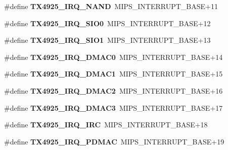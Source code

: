 \begin{DoxyCompactItemize}
\#define {\bfseries T\+X4925\+\_\+\+I\+R\+Q\+\_\+\+N\+A\+ND}~M\+I\+P\+S\+\_\+\+I\+N\+T\+E\+R\+R\+U\+P\+T\+\_\+\+B\+A\+SE+11
\item 
\mbox{\label{group__bsp__interrupt_gad5daa99d1db51d64e13ead1ecc99c114}} 
\#define {\bfseries T\+X4925\+\_\+\+I\+R\+Q\+\_\+\+S\+I\+O0}~M\+I\+P\+S\+\_\+\+I\+N\+T\+E\+R\+R\+U\+P\+T\+\_\+\+B\+A\+SE+12
\item 
\mbox{\label{group__bsp__interrupt_ga7557e681b877f9a799e74fbb255dd68c}} 
\#define {\bfseries T\+X4925\+\_\+\+I\+R\+Q\+\_\+\+S\+I\+O1}~M\+I\+P\+S\+\_\+\+I\+N\+T\+E\+R\+R\+U\+P\+T\+\_\+\+B\+A\+SE+13
\item 
\mbox{\label{group__bsp__interrupt_ga954ddd540c7d88019a894b0a2479c614}} 
\#define {\bfseries T\+X4925\+\_\+\+I\+R\+Q\+\_\+\+D\+M\+A\+C0}~M\+I\+P\+S\+\_\+\+I\+N\+T\+E\+R\+R\+U\+P\+T\+\_\+\+B\+A\+SE+14
\item 
\mbox{\label{group__bsp__interrupt_ga2a1f853ad2494fb003dcf45a51c92e5e}} 
\#define {\bfseries T\+X4925\+\_\+\+I\+R\+Q\+\_\+\+D\+M\+A\+C1}~M\+I\+P\+S\+\_\+\+I\+N\+T\+E\+R\+R\+U\+P\+T\+\_\+\+B\+A\+SE+15
\item 
\mbox{\label{group__bsp__interrupt_ga41db98a82a3a2606a641107179d1d9ca}} 
\#define {\bfseries T\+X4925\+\_\+\+I\+R\+Q\+\_\+\+D\+M\+A\+C2}~M\+I\+P\+S\+\_\+\+I\+N\+T\+E\+R\+R\+U\+P\+T\+\_\+\+B\+A\+SE+16
\item 
\mbox{\label{group__bsp__interrupt_gaa31044b5246a223da704f5ee63cd3afe}} 
\#define {\bfseries T\+X4925\+\_\+\+I\+R\+Q\+\_\+\+D\+M\+A\+C3}~M\+I\+P\+S\+\_\+\+I\+N\+T\+E\+R\+R\+U\+P\+T\+\_\+\+B\+A\+SE+17
\item 
\mbox{\label{group__bsp__interrupt_gaf7c4bbcf678a98aae25f44a9a7217c7e}} 
\#define {\bfseries T\+X4925\+\_\+\+I\+R\+Q\+\_\+\+I\+RC}~M\+I\+P\+S\+\_\+\+I\+N\+T\+E\+R\+R\+U\+P\+T\+\_\+\+B\+A\+SE+18
\item 
\mbox{\label{group__bsp__interrupt_gadcd867070b2acde445cc1aeeb1ba80d7}} 
\#define {\bfseries T\+X4925\+\_\+\+I\+R\+Q\+\_\+\+P\+D\+M\+AC}~M\+I\+P\+S\+\_\+\+I\+N\+T\+E\+R\+R\+U\+P\+T\+\_\+\+B\+A\+SE+19

\end{DoxyCompactItemize}
